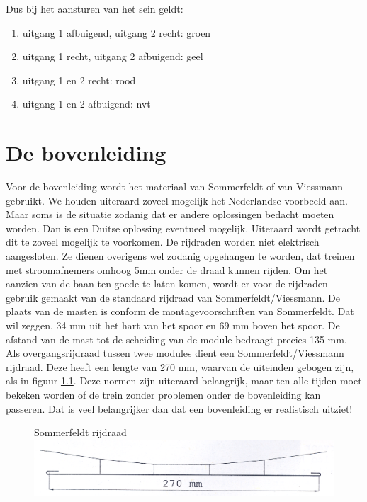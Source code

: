 \documentclass[12pt,a4paper]{report}
\begin{document}
Dus bij het aansturen van het sein geldt:
\begin{enumerate}
\item uitgang 1 afbuigend, uitgang 2 recht: groen
\item uitgang 1 recht, uitgang 2 afbuigend: geel
\item uitgang 1 en 2 recht: rood
\item uitgang 1 en 2 afbuigend: nvt
\end{enumerate}

\chapter{De bovenleiding}
\label{ch:bovenleiding}

Voor de bovenleiding wordt het materiaal van Sommerfeldt of van Viessmann gebruikt. We houden uiteraard zoveel mogelijk het Nederlandse voorbeeld aan. Maar soms is de situatie zodanig dat er andere oplossingen bedacht moeten worden. Dan is een Duitse oplossing eventueel mogelijk. Uiteraard wordt getracht dit te zoveel mogelijk te voorkomen. De rijdraden worden niet elektrisch aangesloten. Ze dienen overigens wel zodanig opgehangen te worden, dat treinen met stroomafnemers omhoog 5mm onder de draad kunnen rijden. Om het aanzien van de baan ten goede te laten komen, wordt er voor de rijdraden gebruik gemaakt van de standaard rijdraad van Sommerfeldt/Viessmann. De plaats van de masten is conform de montagevoorschriften van Sommerfeldt. Dat wil zeggen, 34 mm uit het hart van het spoor en 69 mm boven het spoor. De afstand van de mast tot de scheiding van de module bedraagt precies 135 mm. Als overgangsrijdraad tussen twee modules dient een Sommerfeldt/Viessmann rijdraad. Deze heeft een lengte van 270 mm, waarvan de uiteinden gebogen zijn, als in figuur \ref{figuur9}. Deze normen zijn uiteraard belangrijk, maar ten alle tijden moet bekeken worden of de trein zonder problemen onder de bovenleiding kan passeren. Dat is veel belangrijker dan dat een bovenleiding er realistisch uitziet!

\begin{figure}[!ht]
  \captionbox
  {Sommerfeldt rijdraad\label{figuur9}}
  {\includegraphics[scale=1.0]{images/rcu_figuur9}}
\end{figure}
\end{document}
